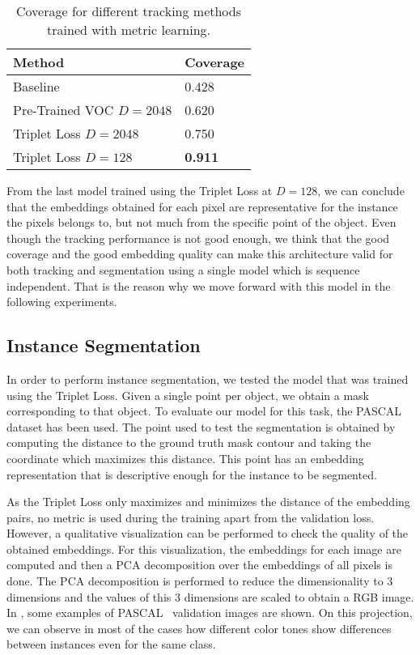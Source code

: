 \begin{table}[h]
  \centering
  \begin{tabular}{l|l}
    \toprule
    Method                   & Coverage       \\
    \midrule
    Baseline                 & 0.428          \\
    Pre-Trained VOC $D=2048$ & 0.620          \\
    Triplet Loss $D=2048$    & 0.750          \\
    Triplet Loss $D=128$     & \textbf{0.911} \\
    \bottomrule
  \end{tabular}
  \caption{Coverage for different tracking methods trained with metric learning. }
  \label{tab:experiments:tracking:coveragemetriclearning}
\end{table}

From the last model trained using the Triplet Loss at $D=128$, we can conclude that the embeddings obtained for each pixel are representative for the instance the pixels belongs to, but not much from the specific point of the object.
Even though the tracking performance is not good enough, we think that the good coverage and the good embedding quality can make this architecture valid for both tracking and segmentation using a single model which is sequence independent.
That is the reason why we move forward with this model in the following experiments.



\subsection{Instance Segmentation}

In order to perform instance segmentation, we tested the model that was trained using the Triplet Loss.
Given a single point per object, we obtain a mask corresponding to that object.
To evaluate our model for this task, the PASCAL~\pascal{} dataset has been used.
The point used to test the segmentation is obtained by computing the distance to the ground truth mask contour and taking the coordinate which maximizes this distance.
This point has an embedding representation that is descriptive enough for the instance to be segmented.

As the Triplet Loss only maximizes and minimizes the distance of the embedding pairs, no metric is used during the training apart from the validation loss.
However, a qualitative visualization can be performed to check the quality of the obtained embeddings.
For this visualization, the embeddings for each image are computed  and then a PCA decomposition over the embeddings of all pixels is done.
The PCA decomposition is performed to reduce the dimensionality to 3 dimensions and the values of this 3 dimensions are scaled to obtain a RGB image.
In , some examples of PASCAL~\pascal{} validation images are shown.
On this projection, we can observe in most of the cases how different color tones show differences between instances even for the same class.

